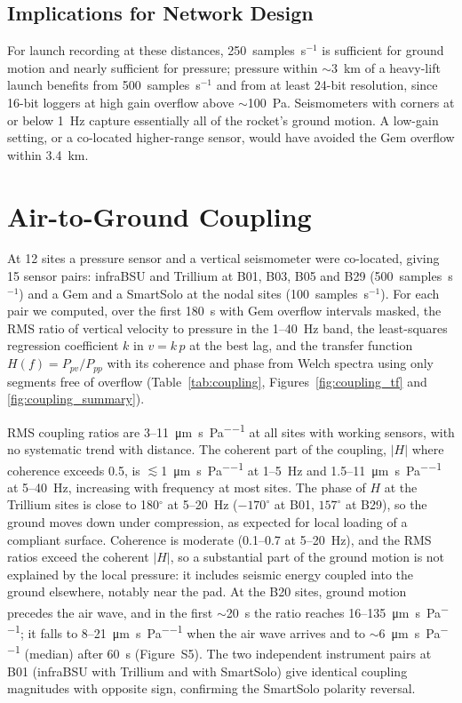 \documentclass[]{seismica}
\newcommand{\suppfig}[1]{Figure~S#1}
\begin{document}
\subsection{Implications for Network Design}

For launch recording at these distances, 250~samples~s$^{-1}$ is
sufficient for ground motion and nearly sufficient for pressure;
pressure within $\sim$3~km of a heavy-lift launch benefits from
500~samples~s$^{-1}$ and from at least 24-bit resolution, since 16-bit
loggers at high gain overflow above $\sim$100~Pa. Seismometers with
corners at or below 1~Hz capture essentially all of the rocket's ground
motion. A low-gain setting, or a co-located higher-range sensor, would
have avoided the Gem overflow within 3.4~km.


\section{Air-to-Ground Coupling}
\label{sec:coupling}

At 12 sites a pressure sensor and a vertical seismometer were
co-located, giving 15 sensor pairs: infraBSU and Trillium at B01, B03, B05 and B29
(500~samples~s$^{-1}$) and a Gem and a SmartSolo at the nodal sites
(100~samples~s$^{-1}$). For each pair we computed, over the first 180~s
with Gem overflow intervals masked, the RMS ratio of vertical velocity to
pressure in the 1--40~Hz band, the least-squares regression coefficient
$k$ in $v = k\,p$ at the best lag, and the transfer function
$H(f) = P_{pv}/P_{pp}$ with its coherence and phase from Welch spectra
using only segments free of overflow (Table~\ref{tab:coupling},
Figures~\ref{fig:coupling_tf} and \ref{fig:coupling_summary}).

RMS coupling ratios are 3--11~\si{\micro\metre\per\second\per\pascal}
at all sites with working sensors, with no systematic trend with
distance. The coherent part of the coupling, $|H|$ where coherence
exceeds 0.5, is $\lesssim$1~\si{\micro\metre\per\second\per\pascal} at
1--5~Hz and 1.5--11~\si{\micro\metre\per\second\per\pascal} at 5--40~Hz,
increasing with frequency at most sites. The phase of $H$ at the
Trillium sites is close to 180$^{\circ}$ at 5--20~Hz ($-170^{\circ}$ at
B01, $157^{\circ}$ at B29), so the ground moves down under compression,
as expected for local loading of a compliant surface. Coherence is
moderate (0.1--0.7 at 5--20~Hz), and the RMS ratios exceed the coherent
$|H|$, so a substantial part of the ground motion is not explained by
the local pressure: it includes seismic energy coupled into the ground
elsewhere, notably near the pad. At the B20 sites, ground motion
precedes the air wave, and in the first $\sim$20~s the ratio reaches
16--135~\si{\micro\metre\per\second\per\pascal}; it falls to
8--21~\si{\micro\metre\per\second\per\pascal} when the air wave arrives
and to $\sim$6~\si{\micro\metre\per\second\per\pascal} (median) after
60~s (\suppfig{5}). The two independent instrument pairs at B01
(infraBSU with Trillium and with SmartSolo) give identical coupling
magnitudes with opposite sign, confirming the SmartSolo polarity
reversal.
\end{document}
